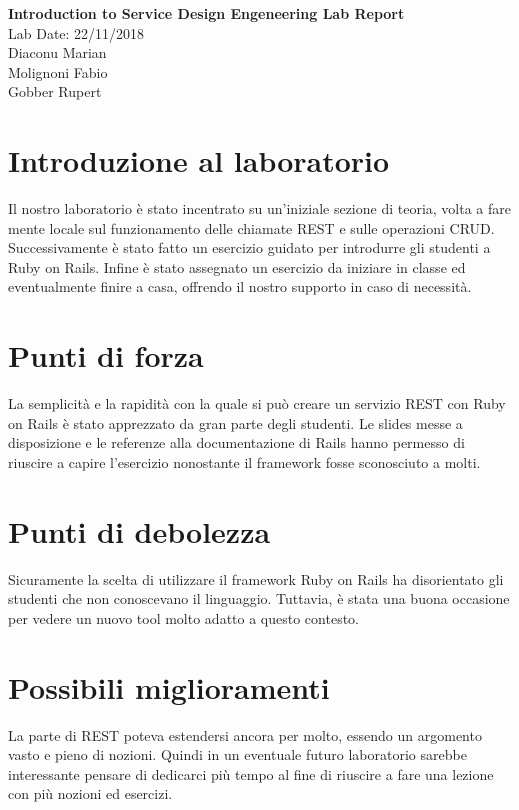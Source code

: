 \documentclass[letterpaper,12pt]{article}
\begin{document}
\noindent
\large\textbf{Introduction to Service Design Engeneering Lab Report}\\

\hfill Lab Date: 22/11/2018 \\
Diaconu Marian \\
Molignoni Fabio \\
Gobber Rupert \\


\section*{Introduzione al laboratorio}
Il nostro laboratorio è stato incentrato su un'iniziale sezione di teoria, volta a fare mente locale sul funzionamento delle chiamate REST e sulle operazioni CRUD.
Successivamente è stato fatto un esercizio guidato per introdurre gli studenti a Ruby on Rails. Infine è stato assegnato un esercizio da iniziare in classe ed eventualmente finire a casa, offrendo il nostro supporto in caso di necessità.

\section*{Punti di forza}
La semplicità e la rapidità con la quale si può creare un servizio REST con Ruby on Rails è stato apprezzato da gran parte degli studenti. Le slides messe a disposizione e le referenze alla documentazione di Rails hanno permesso di riuscire a capire l'esercizio nonostante il framework fosse sconosciuto a molti.

\section*{Punti di debolezza}
Sicuramente  la scelta di utilizzare il framework Ruby on Rails ha disorientato gli studenti che non conoscevano il linguaggio. Tuttavia, è stata una buona occasione per vedere un nuovo tool molto adatto a questo contesto. 

\section*{Possibili miglioramenti}
La parte di REST poteva estendersi ancora per molto, essendo un argomento vasto e pieno di nozioni. Quindi in un eventuale futuro laboratorio sarebbe interessante pensare di dedicarci più tempo al fine di riuscire a fare una lezione con più nozioni ed esercizi.
 
\end{document}
